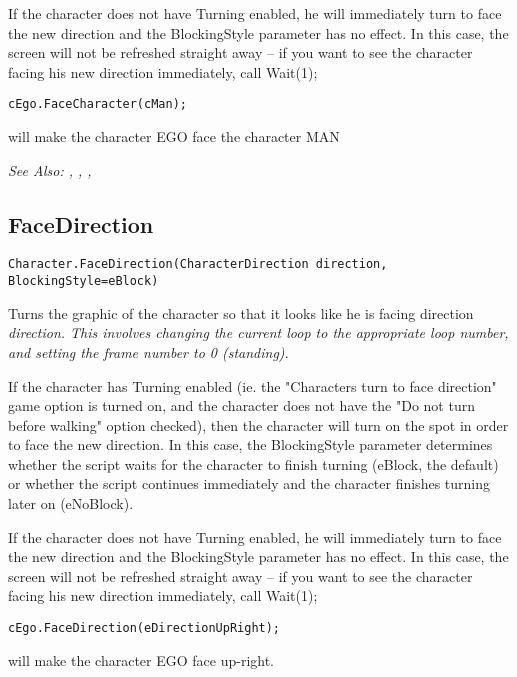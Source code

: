 If the character does not have Turning enabled, he will immediately turn to face the
new direction and the BlockingStyle parameter has no effect. In this case, the screen
will not be refreshed straight away -- if you want to see the character facing his new direction
immediately, call  Wait(1);

\begin{verbatim}
cEgo.FaceCharacter(cMan);
\end{verbatim}
will make the character EGO face the character MAN

\it{See Also:} ,
,
,


\subsection{FaceDirection}\label{Character.FaceDirection}%

\begin{verbatim}
Character.FaceDirection(CharacterDirection direction, BlockingStyle=eBlock)
\end{verbatim}
Turns the graphic of the character so that it looks like he is facing
direction \it{direction}. This involves changing the current loop to the appropriate
loop number, and setting the frame number to 0 (standing).

If the character has Turning enabled (ie. the "Characters turn to face direction" game
option is turned on, and the character does not have the "Do not turn before walking"
option checked), then the character will turn on the spot in order to face the new direction.
In this case, the BlockingStyle parameter determines whether the script waits for the
character to finish turning (eBlock, the default) or whether the script continues immediately
and the character finishes turning later on (eNoBlock).

If the character does not have Turning enabled, he will immediately turn to face the
new direction and the BlockingStyle parameter has no effect. In this case, the screen
will not be refreshed straight away -- if you want to see the character facing his new direction
immediately, call  Wait(1);

\begin{verbatim}
cEgo.FaceDirection(eDirectionUpRight);
\end{verbatim}
will make the character EGO face up-right.

